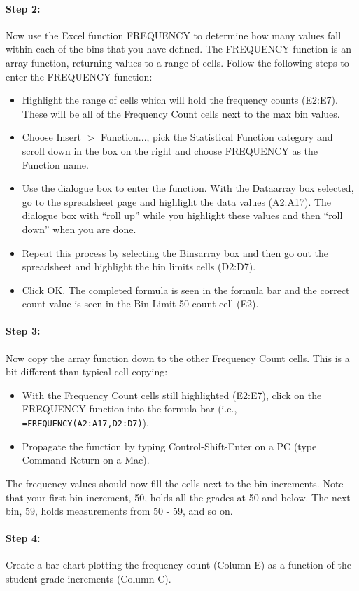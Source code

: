 \paragraph{Step 2:} Now use the Excel function FREQUENCY to determine how many values fall within each of the bins that you have defined. 
The FREQUENCY function is an array function, returning values to a range of cells. 
Follow the following steps to enter the FREQUENCY function:
\begin{itemize}
\itemsep-0.3em
\item Highlight the range of cells which will hold the frequency counts (E2:E7). These will be all of the Frequency Count cells next to the max bin values.
\item Choose Insert $>$ Function..., pick the Statistical Function category and scroll down in the box on the right and choose FREQUENCY as the Function name.
\item Use the dialogue box to enter the function. With the Data\textunderscore array box selected, go to the spreadsheet page and highlight the data values (A2:A17). The dialogue box with ``roll up'' while you highlight these values and then ``roll down'' when you are done.
\item Repeat this process by selecting the Bins\textunderscore array box and then go out the spreadsheet and highlight the bin limits cells (D2:D7).
\item Click OK. The completed formula is seen in the formula bar and the correct count value is seen in the Bin Limit 50 count cell (E2).
\end{itemize}
\paragraph{Step 3:} Now copy the array function down to the other Frequency Count cells. 
This is a bit different than typical cell copying:
\begin{itemize}
\itemsep-0.3em
\item With the Frequency Count cells still highlighted (E2:E7), click on the FREQUENCY function into the formula bar (i.e., \texttt{=FREQUENCY(A2:A17,D2:D7)}).
\item Propagate the function by typing Control-Shift-Enter on a PC (type Command-Return on a Mac).
\end{itemize}
The frequency values should now fill the cells next to the bin increments. 
Note that your first bin increment, 50, holds all the grades at 50 and below. 
The next bin, 59, holds measurements from 50 - 59, and so on.
\paragraph{Step 4:} Create a bar chart plotting the frequency count (Column E) as a function of the student grade increments (Column C).